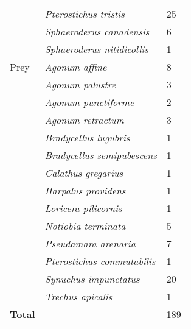 \begin{table}[h]
\begin{tabular}{lll}
                            & \textit{Pterostichus tristis}             & 25 \\
                            & \textit{Sphaeroderus canadensis}          & 6 \\
                            & \textit{Sphaeroderus nitidicollis}        & 1 \\
                            \hline 
        Prey                & \textit{Agonum affine}                    & 8 \\ 
                            & \textit{Agonum palustre}                  & 3 \\
                            & \textit{Agonum punctiforme}               & 2 \\ 
                            & \textit{Agonum retractum}                 & 3 \\ 
                            & \textit{Bradycellus lugubris}             & 1 \\
                            & \textit{Bradycellus semipubescens}        & 1 \\
                            & \textit{Calathus gregarius}               & 1 \\
                            & \textit{Harpalus providens}               & 1 \\
                            & \textit{Loricera pilicornis}              & 1 \\
                            & \textit{Notiobia terminata}               & 5 \\
                            & \textit{Pseudamara arenaria}              & 7 \\
                            & \textit{Pterostichus commutabilis}        & 1 \\
                            & \textit{Synuchus impunctatus}             & 20 \\
                            & \textit{Trechus apicalis}                 & 1 \\
                            \hline 
        \textbf{Total}      &                                           & 189 \\
        \hline
    \end{tabular}
  \end{table}

